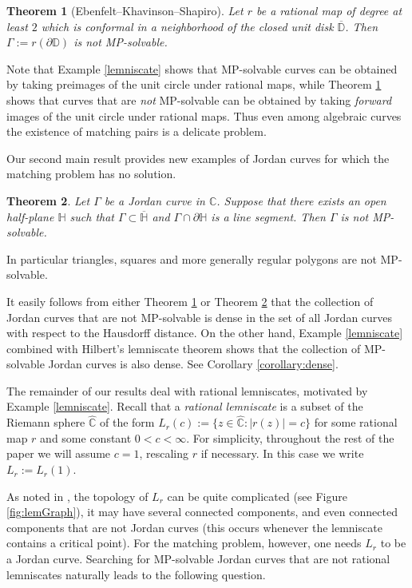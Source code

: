 \documentclass{amsart}
\theoremstyle{plain}
\newtheorem{theorem}{Theorem}[section]
\theoremstyle{definition}
\theoremstyle{remark}
\newcommand{\mC}{\mathbb{C}}
\newcommand{\mD}{\mathbb{D}}
\newcommand{\hC}{\widehat{\mathbb{C}}}
\begin{document}
\begin{theorem}[Ebenfelt--Khavinson--Shapiro]
\label{nomatching}
Let $r$ be a rational map of degree at least $2$ which is conformal in a neighborhood of the closed unit disk $\overline{\mD}$. Then $\Gamma:=r(\partial \mD)$ is not MP-solvable.
\end{theorem}

Note that Example \ref{lemniscate} shows that MP-solvable curves can be obtained by taking preimages of the unit circle under rational maps, while Theorem \ref{nomatching} shows that curves that are \textit{not} MP-solvable can be obtained by taking \textit{forward} images of the unit circle under rational maps. Thus even among algebraic curves the existence of matching pairs is a delicate problem.

Our second main result provides new examples of Jordan curves for which the matching problem has no solution.

\begin{theorem}
\label{mainthm2}
Let $\Gamma$ be a Jordan curve in $\mC$. Suppose that there exists an open half-plane $\mathbb{H}$ such that $\Gamma \subset \overline{\mathbb{H}}$ and $\Gamma \cap \partial \mathbb{H}$ is a line segment. Then $\Gamma$ is not MP-solvable.
\end{theorem}

In particular triangles, squares and more generally regular polygons are not MP-solvable.

It easily follows from either Theorem \ref{nomatching} or Theorem \ref{mainthm2} that the collection of Jordan curves that are not MP-solvable is dense in the set of all Jordan curves with respect to the Hausdorff distance. On the other hand, Example \ref{lemniscate} combined with Hilbert's lemniscate theorem shows that the collection of MP-solvable Jordan curves is also dense. See Corollary \ref{corollary:dense}.

The remainder of our results deal with rational lemniscates, motivated by Example \ref{lemniscate}. Recall that a \textit{rational lemniscate} is a subset of the Riemann sphere $\hC$ of the form $L_r(c):=\{z \in \hC : |r(z)|=c\}$ for some rational map $r$ and some constant $0<c<\infty$. For simplicity, throughout the rest of the paper we will assume $c=1$, rescaling $r$ if necessary. In this case we write $L_r:=L_r(1)$.

As noted in \cite{BishopEremenkoLazebnik2025}, the topology of $L_r$ can be quite complicated (see Figure \ref{fig:lemGraph}), it may have several connected components, and even connected components that are not Jordan curves (this occurs whenever the lemniscate contains a critical point). For the matching problem, however, one needs $L_r$ to be a Jordan curve. Searching for MP-solvable Jordan curves that are not rational lemniscates naturally leads to the following question.
\end{document}
